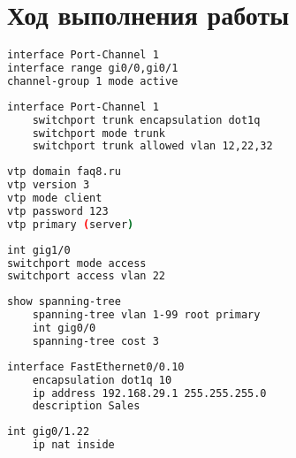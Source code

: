 \section{Ход выполнения работы}

\begin{lstlisting}[language=bash, caption=Настройка $PortChannel$]
interface Port-Channel 1
interface range gi0/0,gi0/1
channel-group 1 mode active
\end{lstlisting}

\begin{lstlisting}[language=bash, caption=Перевод интерфейса в $trunk$]
    interface Port-Channel 1
    switchport trunk encapsulation dot1q
    switchport mode trunk
    switchport trunk allowed vlan 12,22,32    
\end{lstlisting}

\begin{lstlisting}[language=bash, caption=Настройка $VTP$ клиент / сервер]
vtp domain faq8.ru
vtp version 3
vtp mode client
vtp password 123
vtp primary (server)
\end{lstlisting}

\begin{lstlisting}[language=bash, caption=Перевод порта в $access$]
int gig1/0
switchport mode access
switchport access vlan 22
\end{lstlisting}

\begin{lstlisting}[language=bash,caption=Настройка $STP$ и его $Cost$]
    show spanning-tree
    spanning-tree vlan 1-99 root primary
    int gig0/0
    spanning-tree cost 3    
\end{lstlisting}

\begin{lstlisting}[language=bash, caption=Настройка $VLAN$]
    interface FastEthernet0/0.10
    encapsulation dot1q 10
    ip address 192.168.29.1 255.255.255.0
    description Sales
\end{lstlisting}

 \begin{lstlisting}[language=bash, caption=Настройка $NAT$]
    int gig0/1.22
    ip nat inside    
\end{lstlisting}

\pagebreak